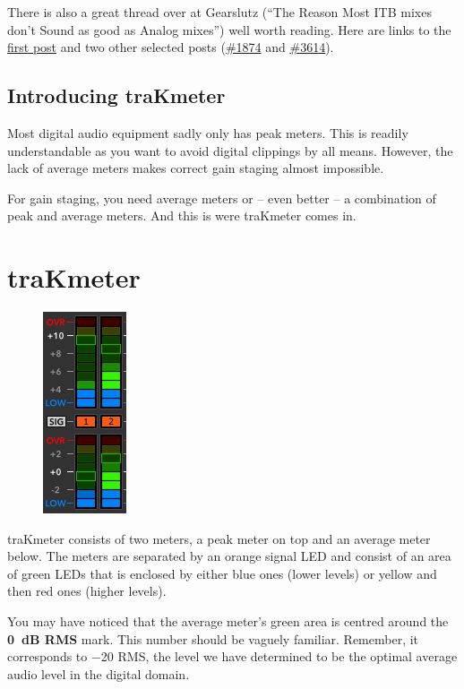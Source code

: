 There is also a great thread over at Gearslutz (``The Reason Most ITB
mixes don’t Sound as good as Analog mixes'') well worth reading.  Here
are links to the
\href{http://www.gearslutz.com/board/5062929-post1.html}{first post}
and two other selected posts
(\href{http://www.gearslutz.com/board/5064831-post1874.html}{\#1874}
and
\href{http://www.gearslutz.com/board/5609740-post3614.html}{\#3614}).

\section{Introducing traKmeter}
\label{sec:introducing_trakmeter}

Most digital audio equipment sadly only has peak meters.  This is
readily understandable as you want to avoid digital clippings by all
means.  However, the lack of average meters makes correct gain staging
almost impossible.

For gain staging, you need average meters or -- even better -- a
combination of peak and average meters.  And this is were traKmeter
comes in.

\chapter{traKmeter}
\label{chap:trakmeter}

\begin{figure}
\includegraphics[scale=\screenshotscale,clip]{include/images/level_meter_complete.png}
\end{figure}

traKmeter consists of two meters, a peak meter on top and an average
meter below.  The meters are separated by an orange signal LED and
consist of an area of green LEDs that is enclosed by either blue ones
(lower levels) or yellow and then red ones (higher levels).

You may have noticed that the average meter's green area is centred
around the \textbf{\SI{0}{\dB} RMS} mark.  This number should be
vaguely familiar.  Remember, it corresponds to \SI{-20}{\dBFS} RMS,
the level we have determined to be the optimal average audio level in
the digital domain.

